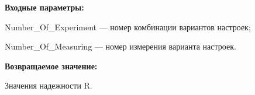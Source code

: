 \textbf{Входные параметры:}

Number\_Of\_Experiment --- номер комбинации вариантов настроек;
 
    Number\_Of\_Measuring --- номер измерения варианта настроек.

\textbf{Возвращаемое значение:}

 
Значения надежности R.